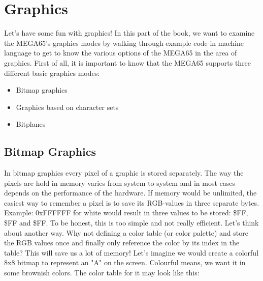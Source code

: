 \usepackage{colortbl}
\usepackage{adjustbox}


\newcommand{\blk}{\cellcolor[rgb]{0,0,0}\textcolor{white} 0 }
\newcommand{\bwn}{\cellcolor[rgb]{.26,.22,0}\textcolor{white} 9 }
\newcommand{\ora}{\cellcolor[rgb]{.44,.31,.15} 8 }
\newcommand{\red}{\cellcolor[rgb]{.6,.4,.35} A }
\newcommand{\lgr}{\cellcolor[rgb]{.58,.58,.58} F }
\newcommand{\yel}{\cellcolor[rgb]{.72,.78,.44} 7 }

\newcommand{\redb}{\cellcolor[rgb]{.6,.4,.35} 1 }

\chapter{Graphics}
\label{cha:graphics}

Let's have some fun with graphics!
In this part of the book, we want to examine the MEGA65's graphics modes by walking through example code in machine language to get to know the various options of the MEGA65 in the area of graphics. First of all, it is important to know that the MEGA65 supports three different basic graphics modes:

\begin{itemize}
	\item Bitmap graphics
	\item Graphics based on character sets
	\item Bitplanes		
\end{itemize}


\section*{Bitmap Graphics}

In bitmap graphics every pixel of a graphic is stored separately. The way the pixels are hold in memory varies from system to system and in most cases depends on the performance of the hardware. If memory would be unlimited, the easiest way to remember a pixel is to save its RGB-values in three separate bytes. Example: 0xFFFFFF for white would result in three values to be stored: \$FF, \$FF and \$FF. To be honest, this is too simple and not really efficient. Let’s think about another way. Why not defining a color table (or color palette) and store the RGB values once and finally only reference the color by its index in the table? This will save us a lot of memory! Let's imagine we would create a colorful 8x8 bitmap to represent an "A" on the screen. Colourful means, we want it in some brownish colors. The color table for it may look like this:

